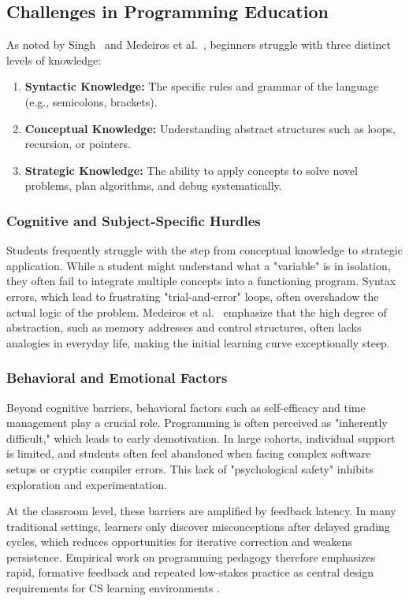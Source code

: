 \documentclass[a4paper, UKenglish, cleveref, autoref, thm-restate]{oasics-v2021}
\begin{document}
\subsection{Challenges in Programming Education}
As noted by Singh~\cite{singh2022challenges} and Medeiros et al.~\cite{medeiros2019review}, beginners struggle with three distinct levels of knowledge:
\begin{enumerate}
    \item \textbf{Syntactic Knowledge:} The specific rules and grammar of the language (e.g., semicolons, brackets).
    \item \textbf{Conceptual Knowledge:} Understanding abstract structures such as loops, recursion, or pointers.
    \item \textbf{Strategic Knowledge:} The ability to apply concepts to solve novel problems, plan algorithms, and debug systematically.
\end{enumerate}

\subsubsection{Cognitive and Subject-Specific Hurdles}
Students frequently struggle with the step from conceptual knowledge to strategic application. While a student might understand what a "variable" is in isolation, they often fail to integrate multiple concepts into a functioning program. Syntax errors, which lead to frustrating "trial-and-error" loops, often overshadow the actual logic of the problem. Medeiros et al.~\cite{medeiros2019review} emphasize that the high degree of abstraction, such as memory addresses and control structures, often lacks analogies in everyday life, making the initial learning curve exceptionally steep.

\subsubsection{Behavioral and Emotional Factors}
Beyond cognitive barriers, behavioral factors such as self-efficacy and time management play a crucial role. Programming is often perceived as "inherently difficult," which leads to early demotivation. In large cohorts, individual support is limited, and students often feel abandoned when facing complex software setups or cryptic compiler errors. This lack of "psychological safety" inhibits exploration and experimentation.

At the classroom level, these barriers are amplified by feedback latency. In many traditional settings, learners only discover misconceptions after delayed grading cycles, which reduces opportunities for iterative correction and weakens persistence. Empirical work on programming pedagogy therefore emphasizes rapid, formative feedback and repeated low-stakes practice as central design requirements for CS learning environments \cite{marwan2022feedback,hattie2007power}.
\end{document}
